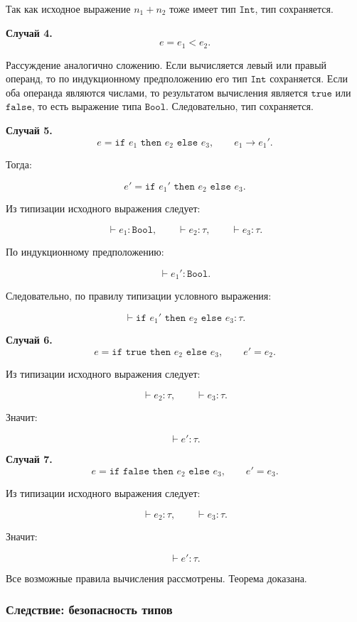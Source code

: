 \documentclass[12pt,a4paper]{article}
\begin{document}
Так как исходное выражение \(n_1 + n_2\) тоже имеет тип \(\texttt{Int}\), тип
сохраняется.

\textbf{Случай 4.}
\[
e = e_1 < e_2.
\]

Рассуждение аналогично сложению. Если вычисляется левый или правый операнд, то по
индукционному предположению его тип \(\texttt{Int}\) сохраняется. Если оба операнда
являются числами, то результатом вычисления является \(\texttt{true}\) или
\(\texttt{false}\), то есть выражение типа \(\texttt{Bool}\). Следовательно, тип
сохраняется.

\textbf{Случай 5.}
\[
e =
\texttt{if } e_1 \texttt{ then } e_2 \texttt{ else } e_3,
\qquad
e_1 \to e_1'.
\]

Тогда:

\[
e' =
\texttt{if } e_1' \texttt{ then } e_2 \texttt{ else } e_3.
\]

Из типизации исходного выражения следует:

\[
\vdash e_1 : \texttt{Bool},
\qquad
\vdash e_2 : \tau,
\qquad
\vdash e_3 : \tau.
\]

По индукционному предположению:

\[
\vdash e_1' : \texttt{Bool}.
\]

Следовательно, по правилу типизации условного выражения:

\[
\vdash
\texttt{if } e_1' \texttt{ then } e_2 \texttt{ else } e_3
:
\tau.
\]

\textbf{Случай 6.}
\[
e = \texttt{if true then } e_2 \texttt{ else } e_3,
\qquad
e' = e_2.
\]

Из типизации исходного выражения следует:

\[
\vdash e_2 : \tau,
\qquad
\vdash e_3 : \tau.
\]

Значит:

\[
\vdash e' : \tau.
\]

\textbf{Случай 7.}
\[
e = \texttt{if false then } e_2 \texttt{ else } e_3,
\qquad
e' = e_3.
\]

Из типизации исходного выражения следует:

\[
\vdash e_2 : \tau,
\qquad
\vdash e_3 : \tau.
\]

Значит:

\[
\vdash e' : \tau.
\]

Все возможные правила вычисления рассмотрены. Теорема доказана.

\subsubsection{Следствие: безопасность типов}
\end{document}
